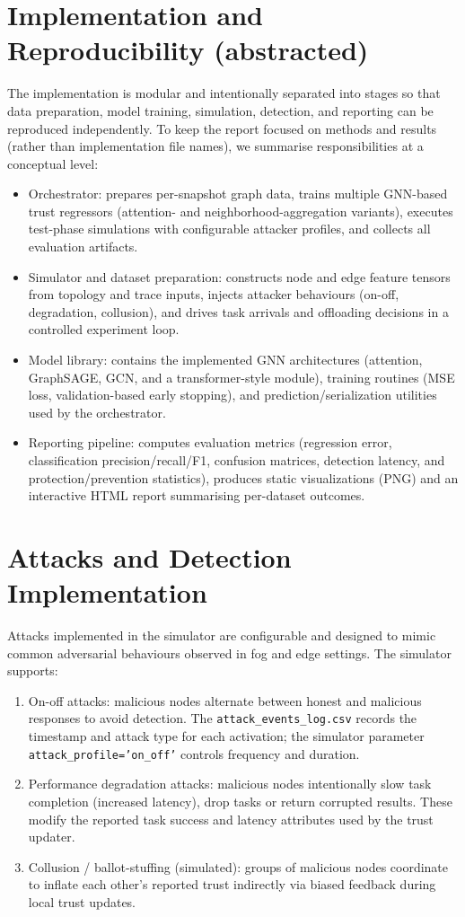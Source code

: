 \documentclass[12pt,a4paper]{article}
\begin{document}
\section{Implementation and Reproducibility (abstracted)}
The implementation is modular and intentionally separated into stages so that data preparation, model training, simulation, detection, and reporting can be reproduced independently. To keep the report focused on methods and results (rather than implementation file names), we summarise responsibilities at a conceptual level:
\begin{itemize}
  \item Orchestrator: prepares per-snapshot graph data, trains multiple GNN-based trust regressors (attention- and neighborhood-aggregation variants), executes test-phase simulations with configurable attacker profiles, and collects all evaluation artifacts.
  \item Simulator and dataset preparation: constructs node and edge feature tensors from topology and trace inputs, injects attacker behaviours (on-off, degradation, collusion), and drives task arrivals and offloading decisions in a controlled experiment loop.
  \item Model library: contains the implemented GNN architectures (attention, GraphSAGE, GCN, and a transformer-style module), training routines (MSE loss, validation-based early stopping), and prediction/serialization utilities used by the orchestrator.
  \item Reporting pipeline: computes evaluation metrics (regression error, classification precision/recall/F1, confusion matrices, detection latency, and protection/prevention statistics), produces static visualizations (PNG) and an interactive HTML report summarising per-dataset outcomes.
\end{itemize}

\section{Attacks and Detection Implementation}
Attacks implemented in the simulator are configurable and designed to mimic common adversarial behaviours observed in fog and edge settings. The simulator supports:
\begin{enumerate}
  \item On-off attacks: malicious nodes alternate between honest and malicious responses to avoid detection. The \texttt{attack\_events\_log.csv} records the timestamp and attack type for each activation; the simulator parameter \texttt{attack\_profile='on\_off'} controls frequency and duration.
  \item Performance degradation attacks: malicious nodes intentionally slow task completion (increased latency), drop tasks or return corrupted results. These modify the reported task success and latency attributes used by the trust updater.
  \item Collusion / ballot-stuffing (simulated): groups of malicious nodes coordinate to inflate each other's reported trust indirectly via biased feedback during local trust updates.
\end{enumerate}
\end{document}

